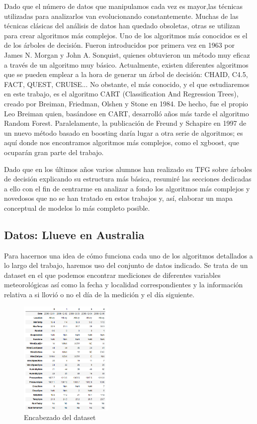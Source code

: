 \documentclass[12pt,twoside]{article}
\begin{document}
Dado que el número de datos que manipulamos cada vez es mayor,las técnicas utilizadas para analizarlos van evolucionando constantemente. Muchas de las técnicas clásicas del análisis de datos han quedado obsoletas, otras se utilizan para crear algoritmos más complejos. Uno de los algoritmos más conocidos es el de los árboles de decisión. Fueron introducidos por primera vez en 1963 por James N. Morgan y John A. Sonquist, quienes obtuvieron un método muy eficaz a través de un algoritmo muy básico. Actualmente, existen diferentes algoritmos que se pueden emplear a la hora de generar un árbol de decisión: CHAID, C4.5, FACT, QUEST, CRUISE... No obstante, el más conocido, y el que estudiaremos en este trabajo, es el algoritmo CART (Classification And Regression Trees), creado por Breiman, Friedman, Olshen y Stone en 1984. De hecho, fue el propio Leo Breiman quien, basándose en CART, desarrolló años más tarde el algoritmo Random Forest. Paralelamente, la publicación de Freund y Schapire en 1997 de un nuevo método basado en boosting daría lugar a otra serie de algoritmos; es aquí donde nos encontramos algoritmos más complejos, como el xgboost, que ocuparán gran parte del trabajo.

Dado que en los últimos años varios alumnos han realizado su TFG sobre árboles de decisión explicando su estructura más básica, resumiré las secciones dedicadas a ello con el fin de centrarme en analizar a fondo los algoritmos más complejos y novedosos que no se han tratado en estos trabajos y, así, elaborar un mapa conceptual de modelos lo más completo posible.



\subsection{Datos: Llueve en Australia} \label{sec: subsec11}

Para hacernos una idea de cómo funciona cada uno de los algoritmos detallados a lo largo del trabajo, haremos uso del conjunto de datos indicado. Se trata de un dataset en el que podemos encontrar mediciones de diferentes variables meteorológicas así como la fecha y localidad correspondientes y la información relativa a si llovió o no el día de la medición y el día siguiente.
\begin{figure}[h]
	\centering
	\includegraphics[width = 0.4\textwidth]{Intro_01}
	\caption{Encabezado del dataset}
\end{figure}
\end{document}
